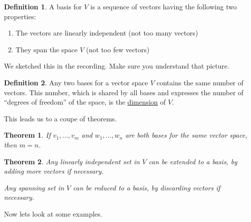 \documentclass[reqno]{amsart}
\newtheorem{thm}{Theorem}
\theoremstyle{definition}
\newtheorem{definition}{Definition}
\begin{document}
\begin{definition}
A basis for $V$ is a sequence of vectors having the following two properties:
%
\begin{enumerate}

\item  The vectors are linearly independent {\color{blue}(not too many vectors)}

\item  They span the space $V$ {\color{blue}(not too few vectors)}

\end{enumerate}
\end{definition}

We sketched this in the recording.  Make sure you understand that picture.

\begin{definition}
Any two bases for a vector space $V$ contains the same number of vectors.  This number, which is
shared by all bases and expresses the number of ``degrees of freedom'' of the space, is the
\underline{dimension} of $V$.
\end{definition}

This leads us to a coupe of theorems.

\begin{thm}
If $v_1,\ldots,v_m$ and $w_1,\ldots,w_n$ are both bases for the same vector space, then $m = n$.
\end{thm}

\begin{thm}
Any linearly independent set in $V$ can be extended to a basis, by adding more vectors if necessary.

Any spanning set in $V$ can be reduced to a basis, by discarding vectors if necessary.
\end{thm}

\bigskip
\bigskip

Now lets look at some examples.
\end{document}
